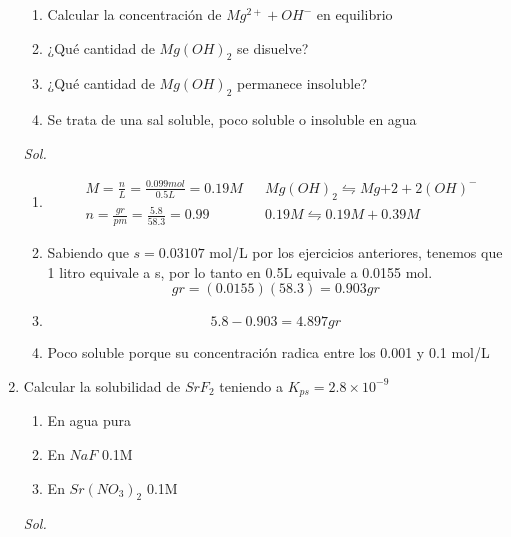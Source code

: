 \begin{enumerate}
	      \begin{enumerate}
		      \item Calcular la concentración de $Mg^{2+}+OH^-$ en equilibrio
		      \item ¿Qué cantidad de $Mg(OH)_2$ se disuelve?
		      \item ¿Qué cantidad de $Mg(OH)_2$ permanece insoluble?
		      \item Se trata de una sal soluble, poco soluble o insoluble en agua
	      \end{enumerate}

	      \textit{ Sol. }

	      \begin{enumerate}
		      \item \begin{align*}
			             & M=\frac{n}{L}=\frac{0.099mol}{0.5L}=0.19M &  & Mg(OH)_2\leftrightharpoons Mg{+2}+2(OH)^- \\
			             & n=\frac{gr}{pm}=\frac{5.8}{58.3}=0.99     &  & 0.19M\leftrightharpoons 0.19M+0.39M
		            \end{align*}
		      \item Sabiendo que $s=0.03107$ mol/L por los ejercicios anteriores, tenemos que 1 litro equivale a s, por lo tanto en 0.5L equivale a 0.0155 mol.
		            \begin{equation*}
			            gr=(0.0155)(58.3)=0.903gr
		            \end{equation*}
		      \item \begin{equation*}
			            5.8-0.903=4.897gr
		            \end{equation*}
		      \item Poco soluble porque su concentración radica entre los 0.001 y 0.1 mol/L
	      \end{enumerate}

	\item Calcular la solubilidad de $SrF_2$ teniendo a $K_{ps}=2.8\times 10^{-9}$

	      \begin{enumerate}
		      \item En agua pura
		      \item En $NaF$ 0.1M
		      \item En $Sr(NO_3)_2$ 0.1M
	      \end{enumerate}

	      \textit{ Sol. }


\end{enumerate}
